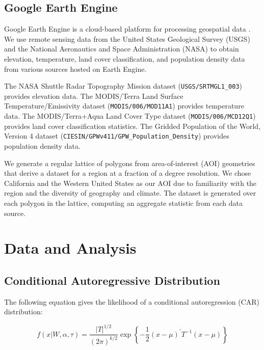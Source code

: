 \documentclass[notitlepage]{article}
\begin{document}
\subsection{Google Earth Engine}

Google Earth Engine is a cloud-based platform for processing geospatial data \cite{gorelick_google_2017}.
We use remote sensing data from the United States Geological Survey (USGS) and the National Aeronautics and Space Administration (NASA) to obtain elevation, temperature, land cover classification, and population density data from various sources hosted on Earth Engine.

The NASA Shuttle Radar Topography Mission dataset (\texttt{USGS/SRTMGL1\_003}) \cite{nasa_srtmg} provides elevation data.
The MODIS/Terra Land Surface Temperature/Emissivity dataset (\texttt{MODIS/006/MOD11A1}) \cite{wan_zhengming_mod11a1_2015} provides temperature data.
The MODIS/Terra+Aqua Land Cover Type dataset (\texttt{MODIS/006/MCD12Q1}) \cite{friedl_mark_mcd12q1_2019} provides land cover classification statistics.
The Gridded Population of the World, Version 4 dataset (\texttt{CIESIN/GPWv411/GPW\_Population\_Density}) \cite{gpwv4} provides population density data.

We generate a regular lattice of polygons from area-of-interest (AOI) geometries that derive a dataset for a region at a fraction of a degree resolution.
We chose California and the Western United States as our AOI due to familiarity with the region and the diversity of geography and climate.
The dataset is generated over each polygon in the lattice, computing an aggregate statistic from each data source.

\section{Data and Analysis}

\subsection{Conditional Autoregressive Distribution}

The following equation gives the likelihood of a conditional autoregression (CAR) distribution:

\begin{equation}
f(x|W, \alpha, \tau) =
    \frac{|T|^{1/2}}{(2\pi)^{k/2}}
    \exp \left\{
        -\frac{1}{2} (x - \mu)^\prime T^{-1} (x - \mu)
    \right\}
\end{equation}
\end{document}
